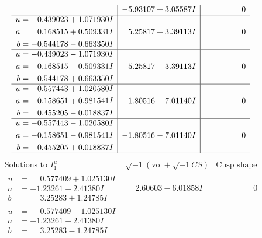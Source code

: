 \documentclass[1p]{elsarticle_modified}
\theoremstyle{definition}
\newcommand{\I}{\sqrt{-1}}
\begin{document}
$$\begin{array}{c|c|c}
 & -5.93107 + 3.05587 I & \phantom{-0.000000 } 0 \\ \hline\begin{aligned}
u &= -0.439023 + 1.071930 I \\
a &= \phantom{-}0.168515 + 0.509331 I \\
b &= -0.544178 - 0.663350 I\end{aligned}
 & \phantom{-}5.25817 + 3.39113 I & \phantom{-0.000000 } 0 \\ \hline\begin{aligned}
u &= -0.439023 - 1.071930 I \\
a &= \phantom{-}0.168515 - 0.509331 I \\
b &= -0.544178 + 0.663350 I\end{aligned}
 & \phantom{-}5.25817 - 3.39113 I & \phantom{-0.000000 } 0 \\ \hline\begin{aligned}
u &= -0.557443 + 1.020580 I \\
a &= -0.158651 + 0.981541 I \\
b &= \phantom{-}0.455205 - 0.018837 I\end{aligned}
 & -1.80516 + 7.01140 I & \phantom{-0.000000 } 0 \\ \hline\begin{aligned}
u &= -0.557443 - 1.020580 I \\
a &= -0.158651 - 0.981541 I \\
b &= \phantom{-}0.455205 + 0.018837 I\end{aligned}
 & -1.80516 - 7.01140 I & \phantom{-0.000000 } 0\\
 \hline 
 \end{array}$$\newpage$$\begin{array}{c|c|c}  
\text{Solutions to }I^u_{1}& \I (\text{vol} + \sqrt{-1}CS) & \text{Cusp shape}\\
 \hline 
\begin{aligned}
u &= \phantom{-}0.577409 + 1.025130 I \\
a &= -1.23261 - 2.41380 I \\
b &= \phantom{-}3.25283 + 1.24785 I\end{aligned}
 & \phantom{-}2.60603 - 6.01858 I & \phantom{-0.000000 } 0 \\ \hline\begin{aligned}
u &= \phantom{-}0.577409 - 1.025130 I \\
a &= -1.23261 + 2.41380 I \\
b &= \phantom{-}3.25283 - 1.24785 I\end{aligned}

\end{array}$$
\end{document}
